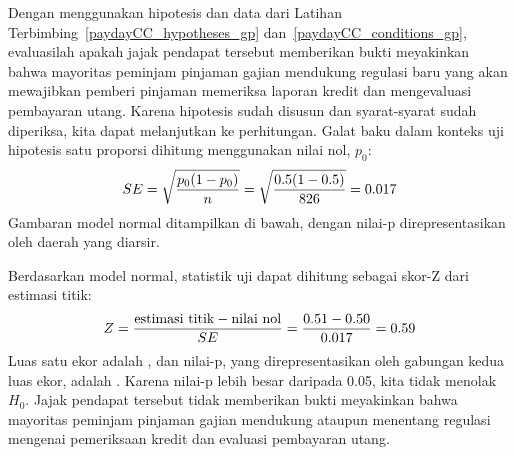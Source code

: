 \begin{examplewrap}
\begin{nexample}{Dengan menggunakan hipotesis dan data dari
    Latihan Terbimbing~\ref{paydayCC_hypotheses_gp}
    dan~\ref{paydayCC_conditions_gp},
    evaluasilah apakah jajak pendapat tersebut memberikan bukti meyakinkan
    bahwa mayoritas peminjam pinjaman gajian mendukung
    regulasi baru yang akan
    mewajibkan pemberi pinjaman memeriksa laporan kredit
    dan mengevaluasi pembayaran utang.}
  Karena hipotesis sudah disusun dan syarat-syarat sudah diperiksa,
  kita dapat melanjutkan ke perhitungan.
  Galat baku dalam konteks uji hipotesis
  satu proporsi dihitung menggunakan nilai nol, $p_0$:
  \begin{align*}
  SE = \sqrt{\frac{p_0 (1 - p_0)}{n}}
      = \sqrt{\frac{0.5 (1 - 0.5)}{826{}}}
      = 0.017{}
  \end{align*}
  Gambaran model normal ditampilkan di bawah,
  dengan nilai-p direpresentasikan oleh daerah yang diarsir.
  \begin{center}
  \end{center}
  Berdasarkan model normal, statistik uji dapat
  dihitung sebagai skor-Z dari estimasi titik:
  \begin{align*}
  Z = \frac{\text{estimasi titik} - \text{nilai nol}}{SE}
      = \frac{0.51{} - 0.50}{0.017{}}
      = 0.59{}
  \end{align*}
  Luas satu ekor adalah \paydayCCOneTail{}, dan nilai-p,
  yang direpresentasikan oleh gabungan kedua luas ekor, adalah \paydayCCPvalue{}.
  Karena nilai-p lebih besar daripada 0.05,
  kita tidak menolak $H_0$.
  Jajak pendapat tersebut tidak memberikan bukti meyakinkan bahwa
  mayoritas peminjam pinjaman gajian mendukung ataupun menentang
  regulasi mengenai pemeriksaan kredit dan evaluasi
  pembayaran utang.
\end{nexample}
\end{examplewrap}

\oneprophtsummary{}


